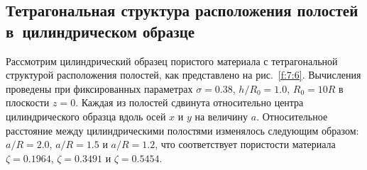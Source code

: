 %
%
%

\subsection{Тетрагональная структура расположения полостей в~цилиндрическом образце}

Рассмотрим цилиндрический образец пористого материала с тетрагональной структурой расположения полостей, как представлено на рис.~\ref{f:7:6}. Вычисления проведены при фиксированных параметрах $\sigma=0.38$, $h/R_0=1.0$, $R_0=10R$ в плоскости $z=0$. Каждая из полостей сдвинута относительно центра цилиндрического образца вдоль осей $x$ и $y$ на величину $a$. Относительное расстояние между цилиндрическими полостями изменялось следующим образом: $a/R=2.0$, $a/R=1.5$ и $a/R=1.2$, что соответствует пористости материала $\zeta=0.1964$, $\zeta=0.3491$ и $\zeta=0.5454$.

